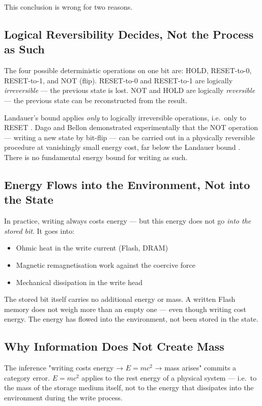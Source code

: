 This conclusion is wrong for two reasons.

\subsection{Logical Reversibility Decides, Not the Process as Such}

The four possible deterministic operations on one bit are: HOLD, RESET-to-0,
RESET-to-1, and NOT (flip). RESET-to-0 and RESET-to-1 are logically
\emph{irreversible} — the previous state is lost. NOT and HOLD are logically
\emph{reversible} — the previous state can be reconstructed from the result.

Landauer's bound applies \emph{only} to logically irreversible operations,
i.e.\ only to RESET \cite{Landauer1961}. Dago and Bellon demonstrated
experimentally that the NOT operation — writing a new state by bit-flip —
can be carried out in a physically reversible procedure at vanishingly small
energy cost, far below the Landauer bound \cite{Dago2023}. There is no
fundamental energy bound for writing as such.

\subsection{Energy Flows into the Environment, Not into the State}

In practice, writing always costs energy — but this energy does not go
\emph{into the stored bit}. It goes into:

\begin{itemize}
  \item Ohmic heat in the write current (Flash, DRAM)
  \item Magnetic remagnetisation work against the coercive force
  \item Mechanical dissipation in the write head
\end{itemize}

The stored bit itself carries no additional energy or mass. A written
Flash memory does not weigh more than an empty one — even though writing
cost energy. The energy has flowed into the environment, not been stored
in the state.

\subsection{Why Information Does Not Create Mass}

The inference "writing costs energy → $E=mc^2$ → mass arises" commits a
category error. $E=mc^2$ applies to the rest energy of a physical system —
i.e.\ to the mass of the storage medium itself, not to the energy that
dissipates into the environment during the write process.

